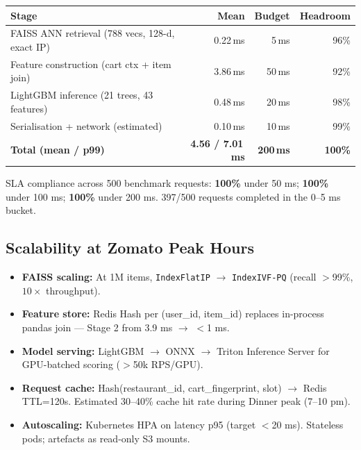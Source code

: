 \documentclass[11pt,a4paper]{article}
\newcommand{\TO}{$\rightarrow$}
\begin{document}
\begin{metricbox}
{\small
\begin{center}
\begin{tabularx}{\linewidth}{>{\RaggedRight\arraybackslash}X r r r}
  \toprule
  \textbf{Stage} & \textbf{Mean} & \textbf{Budget} & \textbf{Headroom} \\
  \midrule
  FAISS ANN retrieval (788 vecs, 128-d, exact IP) &  0.22\,ms &   5\,ms & 96\% \\
  Feature construction (cart ctx + item join)     &  3.86\,ms &  50\,ms & 92\% \\
  LightGBM inference (21 trees, 43 features)      &  0.48\,ms &  20\,ms & 98\% \\
  Serialisation + network (estimated)             &  0.10\,ms &  10\,ms & 99\% \\
  \midrule
  \textbf{Total (mean / p99)} & \textbf{4.56 / 7.01\,ms} &
    \textbf{200\,ms} & \textcolor{good}{\textbf{100\%}} \\
  \bottomrule
\end{tabularx}
\end{center}
}
\end{metricbox}

SLA compliance across 500 benchmark requests:
\textbf{100\%} under 50 ms; \textbf{100\%} under 100 ms;
\textbf{100\%} under 200 ms.
397/500 requests completed in the 0--5 ms bucket.

\subsection{Scalability at Zomato Peak Hours}

\begin{itemize}[noitemsep, leftmargin=*]
  \item \textbf{FAISS scaling:} At 1M items, \texttt{IndexFlatIP}
    \TO{} \texttt{IndexIVF-PQ} (recall $>$99\%, $10\times$ throughput).
  \item \textbf{Feature store:} Redis Hash per (user\_id, item\_id)
    replaces in-process pandas join --- Stage 2 from 3.9 ms \TO{} $<$1 ms.
  \item \textbf{Model serving:} LightGBM \TO{} ONNX \TO{} Triton
    Inference Server for GPU-batched scoring ($>$50k RPS/GPU).
  \item \textbf{Request cache:}
    Hash(restaurant\_id, cart\_fingerprint, slot) \TO{} Redis TTL=120s.
    Estimated 30--40\% cache hit rate during Dinner peak (7--10 pm).
  \item \textbf{Autoscaling:} Kubernetes HPA on latency p95 (target
    $<$20 ms). Stateless pods; artefacts as read-only S3 mounts.
\end{itemize}
\end{document}
